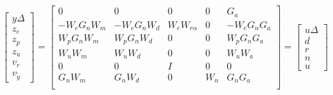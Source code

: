 \begin{equation}
    \begin{aligned}
        \begin{bmatrix}
            y\Delta\\z_e\\z_p\\z_u\\v_r\\v_\tilde{y}
            \end{bmatrix}
            =
            \begin{bmatrix}
                0           & 0           & 0            & 0   & G_a \\
                -W_eG_nW_m  & -W_eG_nW_d  & W_eW_{r\alpha}  & 0   & -W_eG_nG_a\\
                W_pG_nW_m   & W_pG_nW_d   & 0               & 0   & W_pG_nG_a\\
                W_uW_m      & W_uW_d      & 0               & 0   & W_uW_a\\
                0           & 0           & I               & 0   & 0\\
                G_nW_m      & G_nW_d      & 0               & W_n & G_nG_a\\
            \end{bmatrix}
            =
            \begin{bmatrix}
                u\Delta\\d\\r\\n\\u
            \end{bmatrix}
    \end{aligned}
\end{equation}